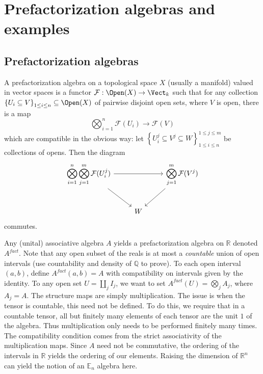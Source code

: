 \chapter{Prefactorization algebras and examples}

\section{Prefactorization algebras}


\begin{definition}\label{3.1.1}
	A prefactorization algebra on a topological space $X$ (usually a manifold) valued in vector spaces is a functor $\mathcal{F} :\Open(X) \to \Vect_{k} $ such that for any collection $\left\{ U_i \subseteq V\right\}_{1\leq i\leq n} \subseteq \Open(X) $ of pairwise disjoint open sets, where $V$ is open, there is a map
	\[
		\bigotimes_{i=1} ^n \mathcal{F} (U_i)\to \mathcal{F} (V)
	\]
	which are compatible in the obvious way: let $\left\{ U_i^j \subseteq V^j\subseteq W \right\}_{1\leq i\leq n} ^{1\leq j\leq m} $ be collections of opens. Then the diagram
	\[\begin{tikzcd}[row sep = 2.5em, column sep = 2.5em]
		\displaystyle{\bigotimes_{i=1} ^n \bigotimes_{j=1} ^m \mathcal{F} (U_i^j)} \ar[rr] \ar[dr] &  & \displaystyle{\bigotimes_{j=1} ^m \mathcal{F} (V^j)}\ar[dl]  \\
	 & W & 
	\end{tikzcd}\]
	commutes.
\end{definition}

\begin{example}\label{3.1.2}
	Any (unital) associative algebra $A$ yields a prefactorization algebra on $\mathbb{R} $ denoted $A^{fact} $. Note that any open subset of the reals is at most a \emph{countable} union of open intervals (use countability and density of $\mathbb{Q} $ to prove). To each open interval $(a,b)$, define $A^{fact} (a,b)=A$ with compatibility on intervals given by the identity. To any open set $U=\amalg_jI_j$, we want to set $A^{fact} (U)=\bigotimes_{j} A_j$, where $A_j=A$. The structure maps are simply multiplication. The issue is when the tensor is countable, this need not be defined. To do this, we require that in a countable tensor, all but finitely many elements of each tensor are the unit $1$ of the algebra. Thus multiplication only needs to be performed finitely many times. The compatibility condition comes from the strict associativity of the multiplication maps. Since $A$ need not be commutative, the ordering of the intervals in $\mathbb{R} $ yields the ordering of our elements. Raising the dimension of $\mathbb{R} ^n$ can yield the notion of an $\mathbb{E} _n$ algebra here.
\end{example}

